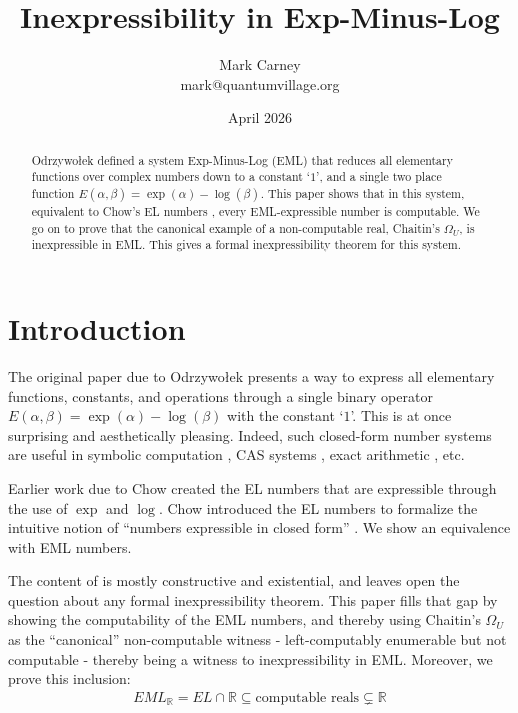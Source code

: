 \documentclass[a4paper,10pt]{article}
\title{Inexpressibility in Exp-Minus-Log}
\author[1]{Mark Carney \orcidlink{0000-0001-9372-9033} \\ \small mark@quantumvillage.org}
\affil[1]{Quantum Village Inc.}
\date{April 2026}
\begin{document}
\maketitle

\begin{abstract}
    Odrzywo\l{}ek defined a system Exp-Minus-Log (EML) \cite{Odrzywolek2026} that reduces all elementary functions over complex numbers down to a constant `$1$', and a single two place function $E(\alpha, \beta) = \exp(\alpha) - \log(\beta)$. This paper shows that in this system, equivalent to Chow's EL numbers \cite{Chow1999}, every EML-expressible number is computable. We go on to prove that the canonical example of a non-computable real, Chaitin's $\Omega_U$, is inexpressible in EML. This gives a formal inexpressibility theorem for this system.
\end{abstract}

\section{Introduction}

The original paper due to Odrzywo\l{}ek \cite{Odrzywolek2026} presents a way to express all elementary functions, constants, and operations through a single binary operator $E(\alpha, \beta) = \exp(\alpha) - \log(\beta)$ with the constant `$1$'. This is at once surprising and aesthetically pleasing. Indeed, such closed-form number systems are useful in symbolic computation \cite{Chow1999}, CAS systems \cite{Richardson1969}, exact arithmetic \cite{Weihrauch2000}, etc.

Earlier work due to Chow \cite{Chow1999} created the EL numbers that are expressible through the use of $\exp$ and $\log$. Chow introduced the EL numbers to formalize the intuitive notion of ``numbers expressible in closed form'' \cite{Chow1999}. We show an equivalence with EML numbers.

The content of \cite{Odrzywolek2026} is mostly constructive and existential, and leaves open the question about any formal inexpressibility theorem. This paper fills that gap by showing the computability of the EML numbers, and thereby using Chaitin's $\Omega_U$ as the ``canonical'' non-computable witness - left-computably enumerable but not computable - thereby being a witness to inexpressibility in EML. Moreover, we prove this inclusion: 
\begin{align*}
    EML_\mathbb{R} = EL \cap \mathbb{R} \subseteq \text{computable reals} \subsetneq \mathbb{R}
\end{align*}
\end{document}
